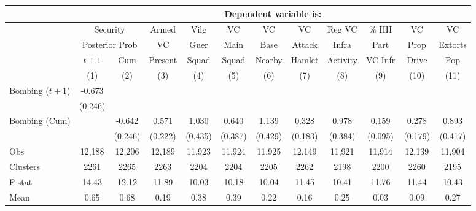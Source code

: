 \begin{tabular}{lccccccccccc}
\hline  & \multicolumn{11}{c}{Dependent variable is:}\\
\hline  & \multicolumn{2}{c}{Security} & Armed & Vilg & VC & VC & VC & Reg VC & \% HH & VC & VC\\
 & \multicolumn{2}{c}{Posterior Prob} & VC & Guer & Main & Base & Attack & Infra & Part & Prop & Extorts\\
 & $ t+1$ & Cum & Present & Squad & Squad & Nearby & Hamlet & Activity & VC Infr & Drive & Pop\\
 & (1) & (2) & (3) & (4) & (5) & (6) & (7) & (8) & (9) & (10) & (11)\\
\hline Bombing ($ t+1$) & -0.673 &  &  &  &  &  &  &  &  &  & \\
 & (0.246) &  &  &  &  &  &  &  &  &  & \\
Bombing (Cum) &  & -0.642 & 0.571 & 1.030 & 0.640 & 1.139 & 0.328 & 0.978 & 0.159 & 0.278 & 0.893\\
 &  & (0.246) & (0.222) & (0.435) & (0.387) & (0.429) & (0.183) & (0.384) & (0.095) & (0.179) & (0.417)\\
Obs & 12,188 & 12,206 & 12,189 & 11,923 & 11,924 & 11,925 & 12,149 & 11,921 & 11,914 & 12,139 & 11,904\\
Clusters & 2261  & 2265  & 2263  & 2204  & 2204  & 2205  & 2262  & 2198  & 2200  & 2260  & 2195 \\
F stat & 14.43  & 12.12  & 11.89  & 10.03  & 10.18  & 10.04  & 11.45  & 10.41  & 11.76  & 11.44  & 10.43 \\
Mean & 0.65 & 0.68 & 0.19 & 0.38 & 0.39 & 0.22 & 0.16 & 0.25 & 0.03 & 0.09 & 0.27\\
\hline\end{tabular}\\
